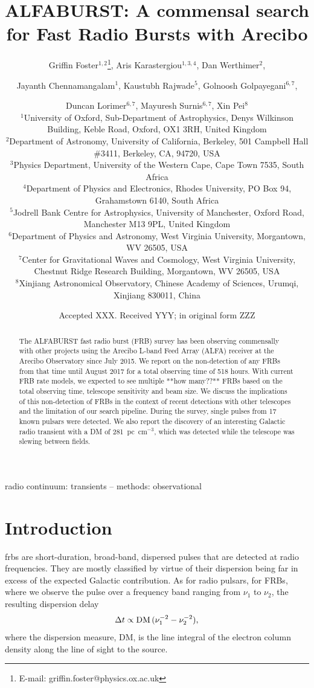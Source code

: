 \documentclass[a4paper,fleqn,usenatbib]{mnras}
\title[The ALFABURST Commensal FRB Survey]{ALFABURST: A commensal search for
Fast Radio Bursts with Arecibo}
\author[G. Foster et al.]{Griffin Foster$^{1,2}$\thanks{E-mail: griffin.foster@physics.ox.ac.uk},
Aris Karastergiou$^{1,3,4}$,
Dan Werthimer$^{2}$,
\and Jayanth Chennamangalam$^{1}$,
Kaustubh Rajwade$^{5}$,
Golnoosh Golpayegani$^{6,7}$,
\and Duncan Lorimer$^{6,7}$,
Mayuresh Surnis$^{6,7}$,
Xin Pei$^{8}$
\\
$^{1}$University of Oxford, Sub-Department of Astrophysics, Denys Wilkinson Building, Keble Road, Oxford, OX1 3RH, United Kingdom\\
$^{2}$Department of Astronomy, University of California, Berkeley, 501 Campbell Hall \#3411, Berkeley, CA, 94720, USA\\
$^{3}$Physics Department, University of the Western Cape, Cape Town 7535, South Africa\\
$^{4}$Department of Physics and Electronics, Rhodes University, PO Box 94, Grahamstown 6140, South Africa\\
$^{5}$Jodrell Bank Centre for Astrophysics, University of Manchester, Oxford Road, Manchester M13 9PL, United Kingdom\\ 
$^{6}$Department of Physics and Astronomy, West Virginia University, Morgantown, WV 26505, USA\\
$^{7}$Center for Gravitational Waves and Cosmology, West Virginia University, Chestnut Ridge Research Building, Morgantown, WV 26505, USA\\
$^{8}$Xinjiang Astronomical Observatory, Chinese Academy of Sciences, Urumqi, Xinjiang 830011, China\\
}
\date{Accepted XXX. Received YYY; in original form ZZZ}
\begin{document}
\label{firstpage}
\pagerange{\pageref{firstpage}--\pageref{lastpage}}
\maketitle

\begin{abstract}
The ALFABURST fast radio burst (FRB) survey has been observing commensally with
other projects using the Arecibo L-band Feed Array (ALFA) receiver at the
Arecibo Observatory since July 2015. We report on the non-detection of any FRBs
from that time until August 2017 for a total observing time of 518 hours.  With
current FRB rate models, we expected to see multiple **how many??** FRBs based
on the total observing time, telescope sensitivity and beam size. We discuss the
implications of this non-detection of FRBs in the context of recent detections
with other telescopes and the limitation of our search pipeline.  During the
survey, single pulses from 17 known pulsars were detected.  We also report the
discovery of an interesting Galactic radio transient with a DM of
281~pc~cm$^{-3}$, which was detected while the telescope was slewing between
fields.
\end{abstract}

\begin{keywords}
radio continuum: transients -- methods: observational
\end{keywords}


\section{Introduction}
\label{sec:intro}

\glspl{frb} are short-duration, broad-band, dispersed pulses that are detected
at radio frequencies. They are mostly classified by virtue of their dispersion
being far in excess of the expected Galactic contribution. As for radio pulsars,
for FRBs, where we observe the pulse over a frequency band ranging from $\nu_1$
to $\nu_2$, the resulting dispersion delay 
%
\begin{equation}
\Delta t \propto {\rm DM} \, (\nu_1^{-2} - \nu_2^{-2}),
\end{equation}
%
where the dispersion measure, DM, is the line integral of the electron column
density along the line of sight to the source.
\end{document}
